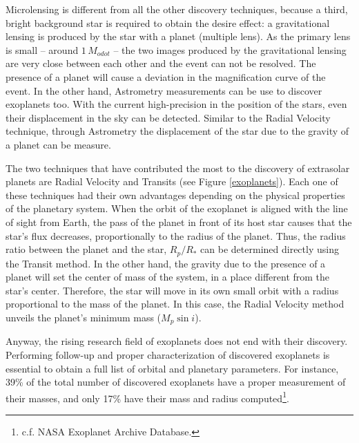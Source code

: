 Microlensing is different from all the other discovery techniques, because a third, bright background star is required to obtain the desire effect: a gravitational lensing is produced by the star with a planet (multiple lens). As the primary lens is small -- around $1\,M_{odot}$ -- the two images produced by the gravitational lensing are very close between each other and the event can not be resolved. The presence of a planet will cause a deviation in the magnification curve of the event. In the other hand, Astrometry measurements can be use to discover exoplanets too. With the current high-precision in the position of the stars, even their displacement in the sky can be detected. Similar to the Radial Velocity technique, through Astrometry the displacement of the star due to the gravity of a planet can be measure. 

The two techniques that have contributed the most to the discovery of extrasolar planets are Radial Velocity and Transits (see Figure \ref{exoplanets}). Each one of these techniques had their own advantages depending on the physical properties of the planetary system. When the orbit of the exoplanet is aligned with the line of sight from Earth, the pass of the planet in front of its host star causes that the star's flux decreases, proportionally to the radius of the planet. Thus, the radius ratio between the planet and the star, $R_{p}/R_{*}$ can be determined directly using the Transit method. In the other hand, the gravity due to the presence of a planet will set the center of mass of the system, in a place different from the star's center. Therefore, the star will move in its own small orbit with a radius proportional to the mass of the planet. In this case, the Radial Velocity method unveils the planet's minimum mass ($M_{p}\sin i$). 

Anyway, the rising research field of exoplanets does not end with their discovery. Performing follow-up and proper characterization of discovered exoplanets is essential to obtain a full list of orbital and planetary parameters. For instance,  39\%  of the total number of discovered exoplanets have a proper measurement of their masses, and only 17\% have their mass and radius computed\footnote{c.f. NASA Exoplanet Archive Database.}. 


